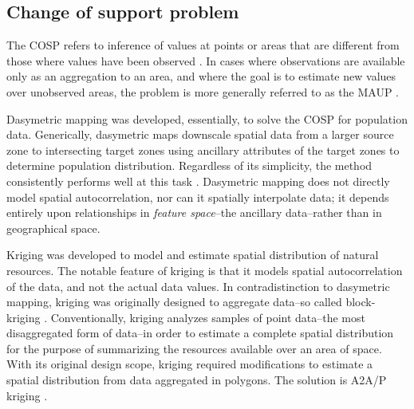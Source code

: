 \documentclass[draft]{article}
\begin{document}
\subsection{Change of support problem}

The COSP refers to inference of values at points or areas that are different from those where values have been observed \cite{gelfand01}.  In cases where observations are available only as an aggregation to an area, and where the goal is to estimate new values over unobserved areas, the problem is more generally referred to as the MAUP \cite{cressie96}.  %

Dasymetric mapping was developed, essentially, to solve the COSP for population data.  Generically, dasymetric maps downscale spatial data from a larger source zone to intersecting target zones using ancillary attributes of the target zones to determine population distribution.  Regardless of its simplicity, the method consistently performs well at this task \cite{eicher01, holt11, barrozo16, amos17}.  Dasymetric mapping does not directly model spatial autocorrelation, nor can it spatially interpolate data; it depends entirely upon relationships in {\em feature space}--the ancillary data--rather than in geographical space.

Kriging was developed to model and estimate spatial distribution of natural resources.  The notable feature of kriging is that it models spatial autocorrelation of the data, and not the actual data values.  In contradistinction to dasymetric mapping, kriging was originally designed to aggregate data--so called block-kriging \cite{cressie90, matheron63}.  Conventionally, kriging analyzes samples of point data--the most disaggregated form of data--in order to estimate a complete spatial distribution for the purpose of summarizing the resources available over an area of space.  With its original design scope, kriging required modifications to estimate a spatial distribution from data aggregated in polygons.  The solution is A2A/P kriging \cite{krivoruchko11, kyriakidis04}.
\end{document}
